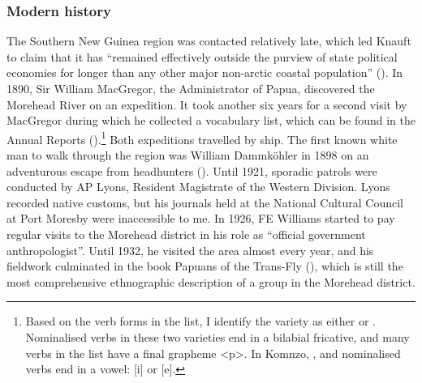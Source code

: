 \subsubsection{Modern history}\label{modernhistory}

The Southern New Guinea region was contacted relatively late, which led Knauft to claim that it has ``remained effectively outside the purview of state political economies for longer than any other major non-arctic coastal population'' (\citeyear[26]{Knauft:1993south}). In 1890, Sir William MacGregor, the Administrator of Papua, discovered the Morehead River on an expedition. It took another six years for a second visit by MacGregor during which he collected a vocabulary list, which can be found in the Annual Reports (\citealt[106]{MacGregor:1896rep}).\footnote{Based on the verb forms in the list, I identify the variety as either  or . Nominalised verbs in these two varieties end in a bilabial fricative, and many verbs in the list have a final grapheme <p>. In Komnzo, ,  and  nominalised verbs end in a vowel: [i] or [e].} Both expeditions travelled by ship. The first known white man to walk through the region was William Dammköhler in 1898 on an adventurous escape from  headhunters (\citealt{Hitchcock:2009gg}). Until 1921, sporadic patrols were conducted by AP Lyons, Resident Magistrate of the Western Division. Lyons recorded native customs, but his journals held at the National Cultural Council at Port Moresby were inaccessible to me. In 1926, FE Williams started to pay regular visits to the Morehead district in his role as ``official government anthropologist''. Until 1932, he visited the area almost every year, and his fieldwork culminated in the book Papuans of the Trans-Fly (\citealt{Williams:1936transfly}), which is still the most comprehensive ethnographic description of a group in the Morehead district.%

